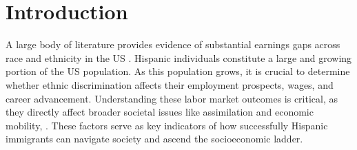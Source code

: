 
\section{Introduction}

A large body of literature provides evidence of substantial earnings gaps across race and ethnicity in the US \autocite{bayer2018divergent, charles2008prejudice}. Hispanic individuals constitute a large and growing portion of the US population. As this population grows, it is crucial to determine whether ethnic discrimination affects their employment prospects, wages, and career advancement. Understanding these labor market outcomes is critical, as they directly affect broader societal issues like assimilation and economic mobility, \autocite{chettyUnitedStatesStill2014, chettyEffectsExposureBetter2016,chettyFadingAmericanDream2017}. These factors serve as key indicators of how successfully Hispanic immigrants can navigate society and ascend the socioeconomic ladder.

